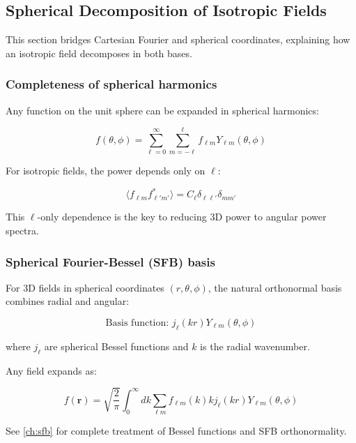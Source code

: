 \subsection{Spherical Decomposition of Isotropic Fields}\label{subsec:ps_spherical}

This section bridges Cartesian Fourier and spherical coordinates, explaining how an isotropic field decomposes in both bases.

\subsubsection{Completeness of spherical harmonics}

Any function on the unit sphere can be expanded in spherical harmonics:

\begin{equation}
f(\theta, \phi) = \sum_{\ell=0}^\infty \sum_{m=-\ell}^\ell f_{\ell m} Y_{\ell m}(\theta, \phi)
\end{equation}

For isotropic fields, the power depends only on $\ell$:

\begin{equation}
\langle f_{\ell m} f^*_{\ell' m'} \rangle = C_\ell \delta_{\ell\ell'} \delta_{mm'}
\end{equation}

This $\ell$-only dependence is the key to reducing 3D power to angular power spectra.

\subsubsection{Spherical Fourier-Bessel (SFB) basis}

For 3D fields in spherical coordinates $(r, \theta, \phi)$, the natural orthonormal basis combines radial and angular:

\begin{equation}
\text{Basis function: } j_\ell(kr) Y_{\ell m}(\theta, \phi)
\end{equation}

where $j_\ell$ are spherical Bessel functions and $k$ is the radial wavenumber.

Any field expands as:

\begin{equation}
f(\mathbf{r}) = \sqrt{\frac{2}{\pi}} \int_0^\infty dk \sum_{\ell m} f_{\ell m}(k) k j_\ell(kr) Y_{\ell m}(\theta, \phi)
\label{eq:sfb_expansion_ref}
\end{equation}

See \cref{ch:sfb} for complete treatment of Bessel functions and SFB orthonormality.
